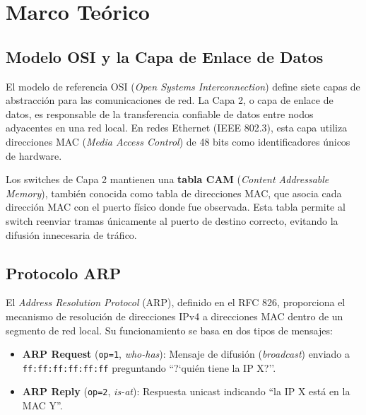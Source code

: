\documentclass[12pt, a4paper]{article}
\begin{document}
\newpage

\section{Marco Te\'orico}

\subsection{Modelo OSI y la Capa de Enlace de Datos}

El modelo de referencia OSI (\textit{Open Systems Interconnection}) define siete capas de abstracci\'on para las comunicaciones de red. La Capa 2, o capa de enlace de datos, es responsable de la transferencia confiable de datos entre nodos adyacentes en una red local. En redes Ethernet (IEEE 802.3), esta capa utiliza direcciones MAC (\textit{Media Access Control}) de 48 bits como identificadores \'unicos de hardware.

Los switches de Capa 2 mantienen una \textbf{tabla CAM} (\textit{Content Addressable Memory}), tambi\'en conocida como tabla de direcciones MAC, que asocia cada direcci\'on MAC con el puerto f\'isico donde fue observada. Esta tabla permite al switch reenviar tramas \'unicamente al puerto de destino correcto, evitando la difusi\'on innecesaria de tr\'afico.

\subsection{Protocolo ARP}

El \textit{Address Resolution Protocol} (ARP), definido en el RFC 826, proporciona el mecanismo de resoluci\'on de direcciones IPv4 a direcciones MAC dentro de un segmento de red local. Su funcionamiento se basa en dos tipos de mensajes:

\begin{itemize}[leftmargin=2cm]
    \item \textbf{ARP Request} (\texttt{op=1}, \textit{who-has}): Mensaje de difusi\'on (\textit{broadcast}) enviado a \texttt{ff:ff:ff:ff:ff:ff} preguntando ``?`qui\'en tiene la IP X?''.
    \item \textbf{ARP Reply} (\texttt{op=2}, \textit{is-at}): Respuesta unicast indicando ``la IP X est\'a en la MAC Y''.
\end{itemize}
\end{document}
